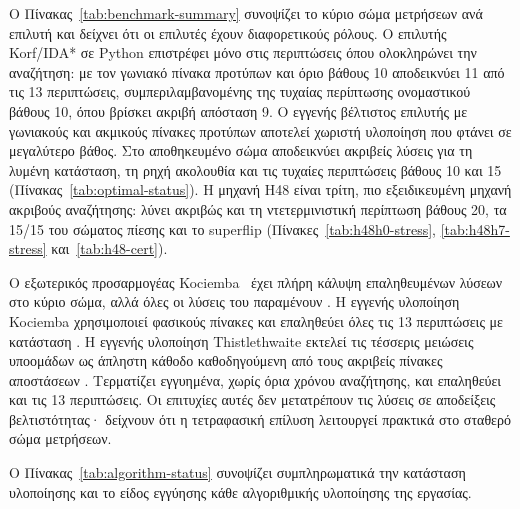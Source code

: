 Ο Πίνακας~\ref{tab:benchmark-summary} συνοψίζει το κύριο σώμα μετρήσεων ανά επιλυτή και δείχνει ότι οι επιλυτές έχουν διαφορετικούς ρόλους. Ο επιλυτής Korf/IDA* σε Python επιστρέφει  μόνο στις περιπτώσεις όπου ολοκληρώνει την αναζήτηση: με τον γωνιακό πίνακα προτύπων και όριο βάθους 10 αποδεικνύει 11 από τις 13 περιπτώσεις, συμπεριλαμβανομένης της τυχαίας περίπτωσης ονομαστικού βάθους 10, όπου βρίσκει ακριβή απόσταση 9. Ο εγγενής βέλτιστος επιλυτής με γωνιακούς και ακμικούς πίνακες προτύπων αποτελεί χωριστή υλοποίηση που φτάνει σε μεγαλύτερο βάθος. Στο αποθηκευμένο σώμα αποδεικνύει ακριβείς λύσεις για τη λυμένη κατάσταση, τη ρηχή ακολουθία και τις τυχαίες περιπτώσεις βάθους 10 και 15 (Πίνακας~\ref{tab:optimal-status}). Η μηχανή H48 είναι τρίτη, πιο εξειδικευμένη μηχανή ακριβούς αναζήτησης: λύνει ακριβώς και τη ντετερμινιστική περίπτωση βάθους 20, τα 15/15 του σώματος πίεσης και το superflip (Πίνακες~\ref{tab:h48h0-stress}, \ref{tab:h48h7-stress} και~\ref{tab:h48-cert}).

Ο εξωτερικός προσαρμογέας Kociemba~\cite{muodovKociembaPkg} έχει πλήρη κάλυψη επαληθευμένων λύσεων στο κύριο σώμα, αλλά όλες οι λύσεις του παραμένουν . Η εγγενής υλοποίηση Kociemba χρησιμοποιεί φασικούς πίνακες και επαληθεύει όλες τις 13 περιπτώσεις με κατάσταση . Η εγγενής υλοποίηση Thistlethwaite εκτελεί τις τέσσερις μειώσεις υποομάδων ως άπληστη κάθοδο καθοδηγούμενη από τους ακριβείς πίνακες αποστάσεων . Τερματίζει εγγυημένα, χωρίς όρια χρόνου αναζήτησης, και επαληθεύει και τις 13 περιπτώσεις. Οι επιτυχίες αυτές δεν μετατρέπουν τις λύσεις σε αποδείξεις βελτιστότητας· δείχνουν ότι η τετραφασική επίλυση λειτουργεί πρακτικά στο σταθερό σώμα μετρήσεων.

\begin{table}[htbp]\centering

\caption[Σύνοψη του κύριου σώματος μετρήσεων ανά επιλυτή]{Σύνοψη του κύριου σώματος μετρήσεων ανά επιλυτή: πλήθος περιπτώσεων, επαληθευμένες λύσεις, διάμεσος χρόνος εκτέλεσης και εμφανιζόμενες καταστάσεις αποτελέσματος. Πηγή: .}
\label{tab:benchmark-summary}
\end{table}

Ο Πίνακας~\ref{tab:algorithm-status} συνοψίζει συμπληρωματικά την κατάσταση υλοποίησης και το είδος εγγύησης κάθε αλγοριθμικής υλοποίησης της εργασίας.

\begin{table}[htbp]\centering

\caption[Κατάσταση υλοποίησης και εγγυήσεις αλγοριθμικών υλοποιήσεων]{Κατάσταση υλοποίησης, εγγύηση βελτιστότητας και πηγή τεκμηρίων για κάθε αλγοριθμική υλοποίηση της εργασίας. Πηγή: παραγόμενος πίνακας κατάστασης αλγορίθμων του προφίλ .}
\label{tab:algorithm-status}
\end{table}

